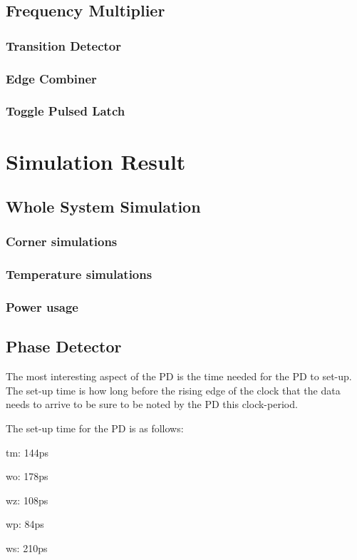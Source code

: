 \documentclass[a4paper,12pt]{article} \usepackage{graphicx}
\begin{document}
\subsection{Frequency Multiplier}
\subsubsection{Transition Detector}
\subsubsection{Edge Combiner}
\subsubsection{Toggle Pulsed Latch}

\section{Simulation Result}
\subsection{Whole System Simulation}
\subsubsection{Corner simulations}
\subsubsection{Temperature simulations}
\subsubsection{Power usage}
\subsection{Phase Detector}
The most interesting aspect of the PD is the time
needed for the PD to set-up. The set-up time is how long
 before the rising edge of the clock that the data needs 
 to arrive to be sure to be noted by the PD this clock-period.

The set-up time for the PD is as follows:

tm: 144ps

wo: 178ps

wz: 108ps

wp: 84ps

ws: 210ps
\end{document}
